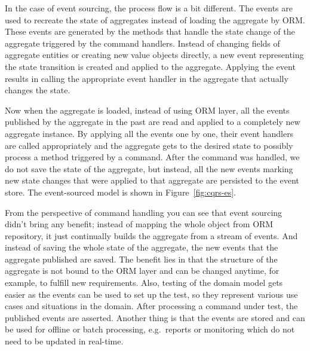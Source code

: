 \documentclass{book}
\begin{document}
In the case of event sourcing, the process flow is a bit different. The
events are used to recreate the state of aggregates instead of loading
the aggregate by ORM. These events are generated by the methods that
handle the state change of the aggregate triggered by the command
handlers. Instead of changing fields of aggregate entities or creating
new value objects directly, a new event representing the state
transition is created and applied to the aggregate. Applying the event
results in calling the appropriate event handler in the aggregate that
actually changes the state.

Now when the aggregate is loaded, instead of using ORM layer, all the
events published by the aggregate in the past are read and applied to a
completely new aggregate instance. By applying all the events one by
one, their event handlers are called appropriately and the aggregate
gets to the desired state to possibly process a method triggered by a
command. After the command was handled, we do not save the state of the
aggregate, but instead, all the new events marking new state changes
that were applied to that aggregate are persisted to the event store.
The event-sourced model is shown in Figure~\ref{fig:cqrs-es}.

From the perspective of command handling you can see that event sourcing
didn't bring any benefit; instead of mapping the whole object from ORM
repository, it just continually builds the aggregate from a stream of
events. And instead of saving the whole state of the aggregate, the new
events that the aggregate published are saved. The benefit lies in that
the structure of the aggregate is not bound to the ORM layer and can be
changed anytime, for example, to fulfill new requirements. Also, testing
of the domain model gets easier as the events can be used to set up the
test, so they represent various use cases and situations in the domain.
After processing a command under test, the published events are
asserted. Another thing is that the events are stored and can be used
for offline or batch processing, e.g.~reports or monitoring which do not
need to be updated in real-time.
\end{document}
